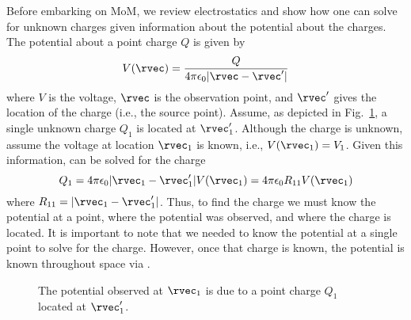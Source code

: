 Before embarking on MoM, we review electrostatics and show how one can
solve for unknown charges given information about the potential about
the charges.  The potential about a point charge $Q$ is given by
\begin{equation}
  V(\rvec) = \frac{Q}{4 \pi \epsilon_0|\rvec-\rvec'|} \label{eq:pointCharge}
\end{equation}
where $V$ is the voltage, $\rvec$ is the observation point, and $\rvec'$
gives the location of the charge (i.e., the source point).  Assume, as
depicted in Fig.\ \ref{fig:singleCharge}, a single unknown charge $Q_1$
is located at $\rvec_1'$.  Although the charge is unknown, assume the
voltage at location $\rvec_1$ is known, i.e., $V(\rvec_1)=V_1$.  Given
this information,  can be solved for the charge
\begin{equation}
  Q_1 =  4 \pi \epsilon_0|\rvec_1-\rvec_1'| V(\rvec_1) 
      =  4 \pi \epsilon_0R_{11} V(\rvec_1) 
\end{equation}
where $R_{11} = |\rvec_1-\rvec_1'|$.  Thus, to find the charge we must
know the potential at a point, where the potential was observed, and
where the charge is located.  It is important to note that we needed
to know the potential at a single point to solve for the charge.
However, once that charge is known, the potential is known throughout
space via .
\begin{figure}
  \begin{center}
  \end{center}
  \caption{The potential observed at $\rvec_1$ is due to a point charge
    $Q_1$ located at $\rvec_1'$.}
  \label{fig:singleCharge}
\end{figure}

